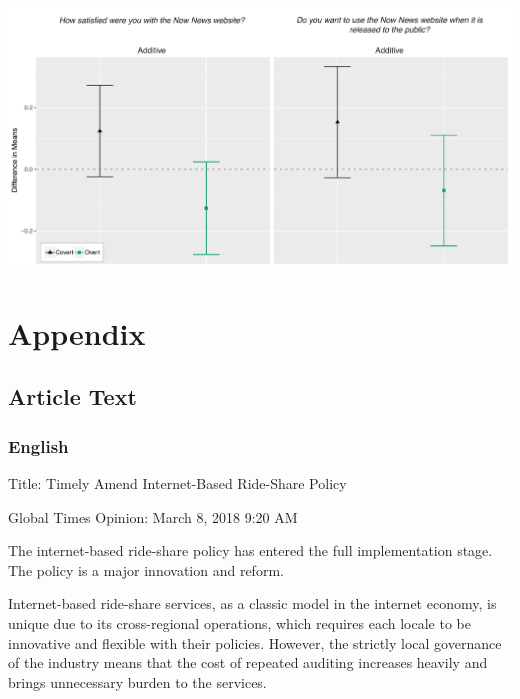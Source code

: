 \documentclass[11pt]{article}
\begin{document}
\begin{minipage}{\linewidth}
    \vspace{3em}
    \begin{center}
        \includegraphics[width=.9\textwidth]{figures/ATE_ux.pdf}\\
        \label{ATE_ux}
    \end{center}
    \vspace{1em}
\end{minipage}


\newpage

\section{Appendix}\label{appendix}

\subsection{Article Text}\label{text}

\subsubsection{English}

Title: Timely Amend Internet-Based Ride-Share Policy\newline

\noindent Global Times Opinion: March 8, 2018 9:20 AM\newline

The internet-based ride-share policy has entered the full implementation stage. The policy is a major innovation and reform.

Internet-based ride-share services, as a classic model in the internet economy, is unique due to its cross-regional operations, which requires each locale to be innovative and flexible with their policies. However, the strictly local governance of the industry means that the cost of repeated auditing increases heavily and brings unnecessary burden to the services.
\end{document}
